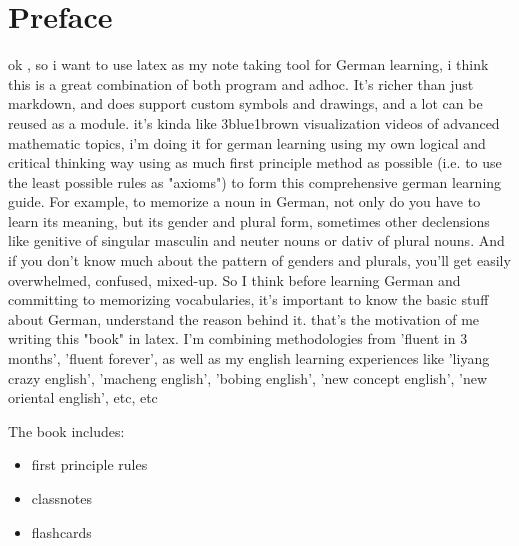 \section*{Preface}

ok , so i want to use latex as my note taking tool for German learning, i think this is a great combination of both program and adhoc.
It's richer than just markdown, and does support custom symbols and drawings, and a lot can be reused as a module.
it's kinda like 3blue1brown visualization videos of advanced mathematic topics, i'm doing it for german learning using my own logical and critical thinking way using as much first principle method as possible (i.e. to use the least possible rules as "axioms") to form this comprehensive german learning guide.
For example, to memorize a noun in German, not only do you have to learn its meaning, but its gender and plural form, sometimes other declensions like genitive of singular masculin and neuter nouns or dativ of plural nouns.
And if you don't know much about the pattern of genders and plurals, you'll get easily overwhelmed, confused, mixed-up.
So I think before learning German and committing to memorizing vocabularies, it's important to know the basic stuff about German, understand the reason behind it.
that's the motivation of me writing this "book" in latex. I'm combining methodologies from 'fluent in 3 months', 'fluent forever', as well as my english learning experiences like 'liyang crazy english', 'macheng english', 'bobing english', 'new concept english', 'new oriental english', etc, etc

The book includes:
\begin{itemize}
    \item first principle rules
    \item classnotes
    \item flashcards
\end{itemize}